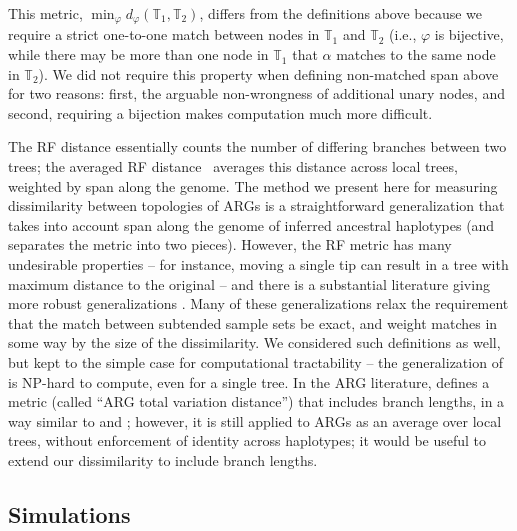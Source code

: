 \documentclass[10pt,twoside,lineno]{gsajnl}
\newcommand{\T}{\mathbb{T}}
\begin{document}
This metric, $\min_\varphi d_\varphi(\T_1,\T_2)$, differs from the definitions above because
we require a strict one-to-one match between nodes in $\T_1$ and $\T_2$
(i.e., $\varphi$ is bijective, while there may be more than one node in $\T_1$
that $\alpha$ matches to the same node in $\T_2$). 
We did not require this property when defining non-matched span above for two reasons:
first, the arguable non-wrongness of additional unary nodes,
and second, requiring a bijection makes computation much more difficult.

The RF distance \citep{robinson1981comparison}
essentially counts the number of differing branches between two trees;
the averaged RF distance~\citep{kuhner2015assessing}
averages this distance across local trees, weighted by span along the genome.
The method we present here for measuring dissimilarity between topologies of ARGs
is a straightforward generalization
that takes into account span along the genome of inferred ancestral haplotypes
(and separates the metric into two pieces).
However, the RF metric has many undesirable properties --
for instance, moving a single tip can result in a tree with maximum distance to the original --
and there is a substantial literature giving more robust generalizations
\citep[reviewed by][]{llabres2021generalized}.
Many of these generalizations \citep[e.g.,][]{bocker2013generalized}
relax the requirement that the match between subtended sample sets be exact,
and weight matches in some way by the size of the dissimilarity.
We considered such definitions as well, but kept to the simple case
for computational tractability --
the generalization of \citet{bocker2013generalized} is NP-hard to compute, even for a single tree.
In the ARG literature, \citet{zhang2023biobankscale}
defines a metric (called ``ARG total variation distance'') that includes branch lengths,
in a way similar to \citet{robinson1979comparison} and \citet{kuhner1994simulation};
however, it is still applied to ARGs as an average over local trees,
without enforcement of identity across haplotypes;
it would be useful to extend our dissimilarity to include branch lengths.

\subsection{Simulations}
\end{document}
